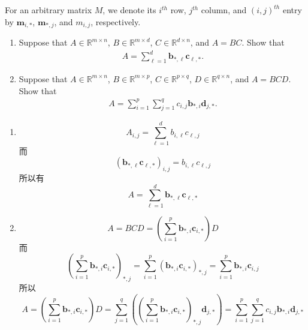 \documentclass[11pt,letter,notitlepage]{article}
\begin{document}
\begin{exercise}
    For an arbitrary matrix $M$, we denote its $i^{th}$ row, $j^{th}$ column, and $(i,j)^{th}$ entry by $\mathbf{m}_{i,*}$, $\mathbf{m}_{*,j}$, and $m_{i,j}$, respectively.
    \begin{enumerate}
        \item Suppose that $A\in\mathbb{R}^{m\times n}$, $B\in\mathbb{R}^{m\times d}$, $C\in\mathbb{R}^{d\times n}$, and $A=BC$. Show that
              \begin{align*}
                  A=\sum_{\ell=1}^d\mathbf{b}_{*,\ell}\mathbf{c}_{\ell,*}.
              \end{align*}

        \item Suppose that $A\in\mathbb{R}^{m\times n}$, $B\in\mathbb{R}^{m\times p}$, $C\in\mathbb{R}^{p\times q}$, $D\in\mathbb{R}^{q\times n}$, and $A=BCD$. Show that
              \begin{align*}
                  A=\sum_{i=1}^p\sum_{j=1}^qc_{i,j}\mathbf{b}_{*,i}\mathbf{d}_{j,*}.
              \end{align*}
    \end{enumerate}
\end{exercise}

\begin{solution}
    \begin{enumerate}
        \item $$A_{i,j}=\sum_{\ell=1}^{d}{b_{i,\ell}c_{\ell,j}}$$
              而 $$\left( \mathbf{b}_{*,\ell}\mathbf{c}_{\ell,*} \right)_{i,j}
                  =b_{i,\ell}c_{\ell,j}$$
              所以有 $$A=\sum_{\ell=1}^d\mathbf{b}_{*,\ell}\mathbf{c}_{\ell,*}$$
        \item $$A= BCD  = \left( \sum_{i=1}^p\mathbf{b}_{*,i}\mathbf{c}_{i,*} \right) D$$
              而 $$\left( \sum_{i=1}^p\mathbf{b}_{*,i}\mathbf{c}_{i,*} \right)_{*,j}
                  =\sum_{i=1}^p \left( \mathbf{b}_{*,i}\mathbf{c}_{i,*}\right)_{*,j}
                  =\sum_{i=1}^p \mathbf{b}_{*,i}\mathbf{c}_{i,j}$$
              所以 $$A
                  =\left( \sum_{i=1}^p\mathbf{b}_{*,i}\mathbf{c}_{i,*} \right) D
                  =\sum_{j=1}^q \left( \left( \sum_{i=1}^p\mathbf{b}_{*,i}\mathbf{c}_{i,*} \right)_{*,j} \mathbf{d}_{j,*} \right)
                  =\sum_{i=1}^p\sum_{j=1}^qc_{i,j}\mathbf{b}_{*,i}\mathbf{d}_{j,*}$$
    \end{enumerate}
\end{solution}
\end{document}
